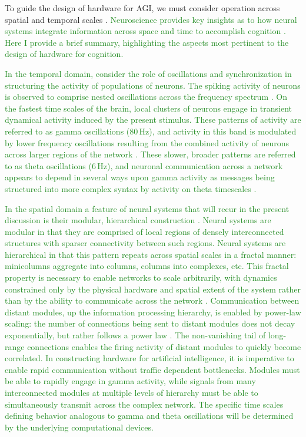 \documentclass{article}
\begin{document}
\begin{multicols}{2}
To guide the design of hardware for AGI, we must consider operation across spatial and temporal scales \cite{beba2017,khma2018}. \textcolor{ForestGreen}{Neuroscience provides key insights as to how neural systems integrate information across space and time to accomplish cognition \cite{bu2006,baga2011}. Here I provide a brief summary, highlighting the aspects most pertinent to the design of hardware for cognition.} 

\textcolor{ForestGreen}{In the temporal domain, consider the role of oscillations and synchronization \cite{bu2006} in structuring the activity of populations of neurons. The spiking activity of neurons is observed to comprise nested oscillations across the frequency spectrum \cite{budr2004,bu2006}. On the fastest time scales of the brain, local clusters of neurons engage in transient dynamical activity induced by the present stimulus. These patterns of activity are referred to as gamma oscillations (80\,Hz), and activity in this band is modulated by lower frequency oscillations \cite{caed2006,jeco2007} resulting from the combined activity of neurons across larger regions of the network \cite{stsa2000}. These slower, broader patterns are referred to as theta oscillations (6\,Hz), and neuronal communication across a network appears to depend in several ways upon gamma activity as messages being structured into more complex syntax by activity on theta timescales \cite{fr2015,bu2019}.}

\textcolor{ForestGreen}{In the spatial domain a feature of neural systems that will recur in the present discussion is their modular, hierarchical construction \cite{mela2010,beba2017,khma2018}. Neural systems are modular in that they are comprised of local regions of densely interconnected structures with sparser connectivity between such regions. Neural systems are hierarchical in that this pattern repeats across spatial scales in a fractal manner: minicolumns aggregate into columns, columns into complexes, etc. This fractal property is necessary to enable networks to scale arbitrarily, with dynamics constrained only by the physical hardware and spatial extent of the system rather than by the ability to communicate across the network \cite{plth2006}. Communication between distant modules, up the information processing hierarchy, is enabled by power-law scaling: the number of connections being sent to distant modules does not decay exponentially, but rather follows a power law \cite{bagr2010,spte2016}. The non-vanishing tail of long-range connections enables the firing activity of distant modules to quickly become correlated. In constructing hardware for artificial intelligence, it is imperative to enable rapid communication without traffic dependent bottlenecks. Modules must be able to rapidly engage in gamma activity, while signals from many interconnected modules at multiple levels of hierarchy must be able to simultaneously transmit across the complex network. The specific time scales defining behavior analogous to gamma and theta oscillations will be determined by the underlying computational devices.}


\end{multicols}
\end{document}
